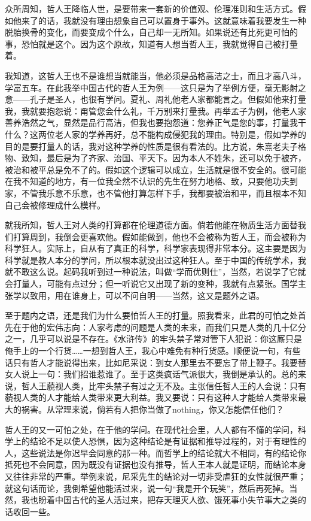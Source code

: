 众所周知，哲人王降临人世，是要带来一套新的价值观、伦理准则和生活方式。假如他来了的话，我就没有理由想象自己可以置身于事外。这就意味着我要发生一种脱胎换骨的变化，而要变成个什么，自己却一无所知。如果说还有比死更可怕的事，恐怕就是这个。因为这个原故，知道有人想当哲人王，我就觉得自己被打量着。 

我知道，这哲人王也不是谁想当就能当，他必须是品格高洁之士，而且才高八斗，学富五车。在此我举中国古代的哲人王为例——这只是为了举例方便，毫无影射之意——孔子是圣人，也很有学问。夏礼、周礼他老人家都能言之。但假如他来打量我，我就要抱怨说：甭管您会什么礼，千万别来打量我。再举孟子为例，他老人家善养浩然之气，显然是品行高洁，但我也要抱怨道：您养正气是您的事，打量我干什么？这两位老人家的学养再好，总不能构成侵犯我的理由。特别是，假如学养的目的是要打量人的话，我对这种学养的性质是很有看法的。比方说，朱熹老夫子格物、致知，最后是为了齐家、治国、平天下。因为本人不姓朱，还可以免于被齐，被治和被平总是免不了的。假如这个逻辑可以成立，生活就是很不安全的。很可能在我不知道的地方，有一位我全然不认识的先生在努力地格、致，只要他功夫到家，不管我乐意不乐意，也不管他打算怎样下手，我都要被治和平，而且根本不知自己会被修理成什么模样。 

就我所知，哲人王对人类的打算都在伦理道德方面。倘若他能在物质生活方面替我们打算周到，我倒会更喜欢他。假如能做到，他也不会被称为哲人王，而会被称为科学狂人。实际上，自从有了真正的科学，科学家表现得非常本分。这主要是因为科学就是教人本分的学问，所以根本就没出过这种狂人。至于中国的传统学术，我就不敢这么说。起码我听到过一种说法，叫做“学而优则仕”，当然，若说学了它就会打量人，可能有点过分；但一听说它又出现了新的变种，我就有点紧张。国学主张学以致用，用在谁身上，可以不问自明——当然，这又是题外之语。 

至于题内之语，还是我们为什么要怕哲人王的打量。照我看来，此君的可怕之处首先在于他的宏伟志向：人家考虑的问题是人类的未来，而我们只是人类的几十亿分之一，几乎可以说是不存在。《水浒传》的牢头禁子常对管下人犯说：你这厮只是俺手上的一个行货……一想到哲人王，我心中难免有种行货感。顺便说一句，有些话只有哲人才能说得出来，比如尼采说：到女人那里去不要忘了带上鞭子。我要替女人说上一句：我们招谁惹谁了。至于这类疯话气派很大，我倒是承认的。总的来说，哲人王藐视人类，比牢头禁子有过之无不及。主张信任哲人王的人会说：只有藐视人类的人才能给人类带来更大利益。我又要说：只有这种人才能给人类带来最大的祸害。从常理来说，倘若有人把你当做了nothing，你又怎能信任他们？ 

哲人王的又一可怕之处，在于他的学问。在现代社会里，人人都有不懂的学问，科学上的结论不足以使人恐惧，因为这种结论是有证据和推导过程的，对于有理性的人，这些说法是你迟早会同意的那一种。而哲学上的结论就大不相同，有的结论你抵死也不会同意，因为既没有证据也没有推导，哲人王本人就是证明，而结论本身又往往非常的严重。举例来说，尼采先生的结论对一切非受虐狂的女性就很严重；就这句话而论，我倒希望他能活过来，说一句“我是开个玩笑”，然后再死掉。当然，我也盼着中国古代的圣人活过来，把存天理灭人欲、饿死事小失节事大之类的话收回一些。 

